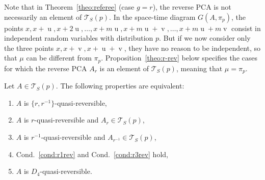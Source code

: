 \documentclass[10pt]{amsart}
\theoremstyle{definition}\newtheorem{defi}[theo]{Definition}\newtheorem{rema}[theo]{Remark}\newtheorem{exam}[theo]{Example}\newtheorem{exem}[theo]{Example}\newtheorem{nota}[theo]{Notation}
\newcounter{a}
\newcommand{\Cond}{Cond.}
\newcommand{\triang}[2]{\mathcal{T}_{#1} \left(#2 \right)}
\DeclareMathOperator{\vu}{u}
\DeclareMathOperator{\vv}{v}
\begin{document}
Note that in Theorem~\ref{theo:referee} (case $g=r$), the reverse PCA is not necessarily an element of $\triang{S}{p}$. In the space-time diagram $G(A,\pi_p)$, the points $x,x+\vu,x+2\vu,\ldots,x+m\vu,x+m\vu+\vv,\ldots,x+m\vu+m\vv$ consist in independent random variables with distribution $p$. But if we now consider only the three points $x,x+\vv,x+\vu+\vv$, they have no reason to be independent, so that $\mu$ can be different from $\pi_p$. Proposition~\ref{theo:r-rev} below specifies the cases for which the reverse PCA $A_r$ is an element of $\triang{S}{p}$, meaning that $\mu=\pi_p$.

\begin{prop}\label{theo:r-rev}
Let $A \in \triang{S}{p}$. The following properties are equivalent:
\begin{enumerate}
\item \label{list4.4.1}$A$ is $\{r,r^{-1}\}$-quasi-reversible,
\item \label{list4.4.2}$A$ is $r$-quasi-reversible and $A_r \in \triang{S}{p}$,
\item \label{list4.4.3}$A$ is $r^{-1}$-quasi-reversible and $A_{r^{-1}} \in \triang{S}{p}$,
\item \label{list4.4.4}\Cond~\ref{cond:r1rev} and \Cond~\ref{cond:r3rev} hold,
\item \label{list4.4.5}$A$ is $D_4$-quasi-reversible.
\end{enumerate}
\end{prop}
\end{document}

